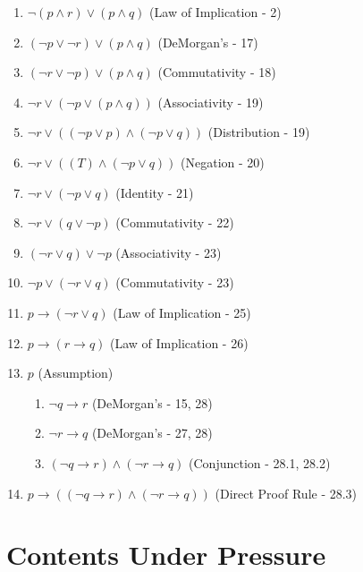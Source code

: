 \documentclass[11pt]{article}
\makeatletter
\def\imp{\rightarrow}
\newenvironment{level}%
{\addtolength{\itemindent}{2em}}%
{\addtolength{\itemindent}{-2em}}
\renewenvironment{proof}[1][\proofname]{\par
  \normalfont \topsep6\p@\@plus6\p@\relax
  \trivlist
  \item[\hskip\labelsep
        \itshape
    #1\@addpunct{.}]\ignorespaces
}{%
  \endtrivlist\@endpefalse
}
\makeatother
\begin{document}
\begin{proof}[\textbf{Prove $p \imp ((q \imp r) \land (r \imp q))$}]
\begin{enumerate}
		\item $\neg (p \land r) \lor (p \land q)$ \hfill (Law of Implication - 2)
		\item $(\neg p \lor \neg r) \lor (p \land q)$ \hfill (DeMorgan's - 17)
		\item $(\neg r \lor \neg p) \lor (p \land q)$ \hfill (Commutativity - 18)
		\item $\neg r \lor (\neg p \lor (p \land q))$ \hfill (Associativity - 19)
		\item $\neg r \lor ((\neg p \lor p) \land (\neg p \lor q))$ \hfill (Distribution - 19)
		\item $\neg r \lor ((T) \land (\neg p \lor q))$ \hfill (Negation - 20)
		\item $\neg r \lor (\neg p \lor q)$ \hfill (Identity - 21)
		\item $\neg r \lor (q \lor \neg p)$ \hfill (Commutativity - 22)
		\item $(\neg r \lor q) \lor \neg p$ \hfill (Associativity - 23)
		\item $\neg p \lor (\neg r \lor q)$ \hfill (Commutativity - 23)
		\item $p \imp (\neg r \lor q)$ \hfill (Law of Implication - 25)
		\item $p \imp (r \imp q)$ \hfill (Law of Implication - 26)
		\item $p$ \hfill (Assumption)
			\begin{enumerate}
			\begin{level}
				\item $\neg q \imp r$ \hfill (DeMorgan's - 15, 28)
				\item $\neg r \imp q$ \hfill (DeMorgan's - 27, 28)
				\item $(\neg q \imp r) \land (\neg r \imp q)$ \hfill (Conjunction - 28.1, 28.2)
			\end{level}
			\end{enumerate}
		\item $p \imp ((\neg q \imp r) \land (\neg r \imp q))$ \hfill (Direct Proof Rule - 28.3)
	\end{enumerate}
\end{proof}

\section{Contents Under Pressure} %
\end{document}
